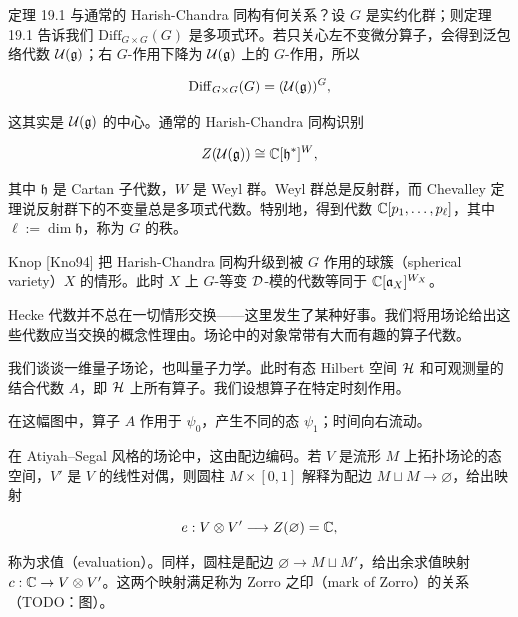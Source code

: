 \begin{remark}
定理 19.1 与通常的 Harish-Chandra 同构有何关系？设 $G$ 是实约化群；则定理 19.1 告诉我们 $\mathrm{Diff}_{G\times G}(G)$ 是多项式环。若只关心左不变微分算子，会得到泛包络代数 $\mathcal{U}(\mathfrak{g})$；右 $G$-作用下降为 $\mathcal{U}(\mathfrak{g})$ 上的 $G$-作用，所以

\[\mathrm{Diff}_{G\times G}(G)=(\mathcal{U}(\mathfrak{g}))^G,\]

这其实是 $\mathcal{U}(\mathfrak{g})$ 的中心。通常的 Harish-Chandra 同构识别

\[Z(\mathcal{U}(\mathfrak{g}))\cong \mathbb{C}[\mathfrak{h}^*]^W,\]

其中 $\mathfrak{h}$ 是 Cartan 子代数，$W$ 是 Weyl 群。Weyl 群总是反射群，而 Chevalley 定理说反射群下的不变量总是多项式代数。特别地，得到代数 $\mathbb{C}[p_1,\dots,p_\ell]$，其中 $\ell:=\dim\mathfrak{h}$，称为 $G$ 的秩。

Knop [Kno94] 把 Harish-Chandra 同构升级到被 $G$ 作用的球簇（spherical variety）$X$ 的情形。此时 $X$ 上 $G$-等变 $\mathcal{D}$-模的代数等同于 $\mathbb{C}[\mathfrak{a}_X]^{W_X}$。
\end{remark}

Hecke 代数并不总在一切情形交换——这里发生了某种好事。我们将用场论给出这些代数应当交换的概念性理由。场论中的对象常带有大而有趣的算子代数。

我们谈谈一维量子场论，也叫量子力学。此时有态 Hilbert 空间 $\mathcal{H}$ 和可观测量的结合代数 $A$，即 $\mathcal{H}$ 上所有算子。我们设想算子在特定时刻作用。

\begin{center}
\end{center}

在这幅图中，算子 $A$ 作用于 $\psi_0$，产生不同的态 $\psi_1$；时间向右流动。

在 Atiyah–Segal 风格的场论中，这由配边编码。若 $V$ 是流形 $M$ 上拓扑场论的态空间，$V'$ 是 $V$ 的线性对偶，则圆柱 $M\times[0,1]$ 解释为配边 $M\sqcup M\to\varnothing$，给出映射

\[e:V\otimes V'\longrightarrow Z(\varnothing)=\mathbb{C},\]

称为求值（evaluation）。同样，圆柱是配边 $\varnothing\to M\sqcup M'$，给出余求值映射 $c:\mathbb{C}\to V\otimes V'$。这两个映射满足称为 Zorro 之印（mark of Zorro）的关系（TODO：图）。

